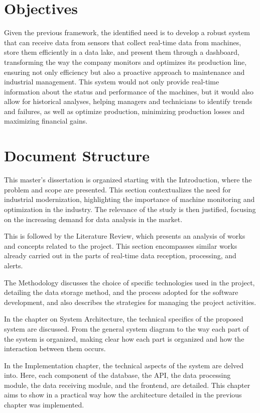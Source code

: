 \section{Objectives}
Given the previous framework, the identified need is to develop a robust system that can receive data from sensors that collect real-time data from machines, store them efficiently in a data lake, and present them through a dashboard, transforming the way the company monitors and optimizes its production line, ensuring not only efficiency but also a proactive approach to maintenance and industrial management. This system would not only provide real-time information about the status and performance of the machines, but it would also allow for historical analyses, helping managers and technicians to identify trends and failures, as well as optimize production, minimizing production losses and maximizing financial gains.

\section{Document Structure}
This master's dissertation is organized starting with the Introduction, where the problem and scope are presented. This section contextualizes the need for industrial modernization, highlighting the importance of machine monitoring and optimization in the industry. The relevance of the study is then justified, focusing on the increasing demand for data analysis in the market.

This is followed by the Literature Review, which presents an analysis of works and concepts related to the project. This section encompasses similar works already carried out in the parts of real-time data reception, processing, and alerts.

The Methodology discusses the choice of specific technologies used in the project, detailing the data storage method, and the process adopted for the software development, and also describes the strategies for managing the project activities.

In the chapter on System Architecture, the technical specifics of the proposed system are discussed. From the general system diagram to the way each part of the system is organized, making clear how each part is organized and how the interaction between them occurs.

In the Implementation chapter, the technical aspects of the system are delved into. Here, each component of the database, the \gls{API}, the data processing module, the data receiving module, and the frontend, are detailed. This chapter aims to show in a practical way how the architecture detailed in the previous chapter was implemented.

